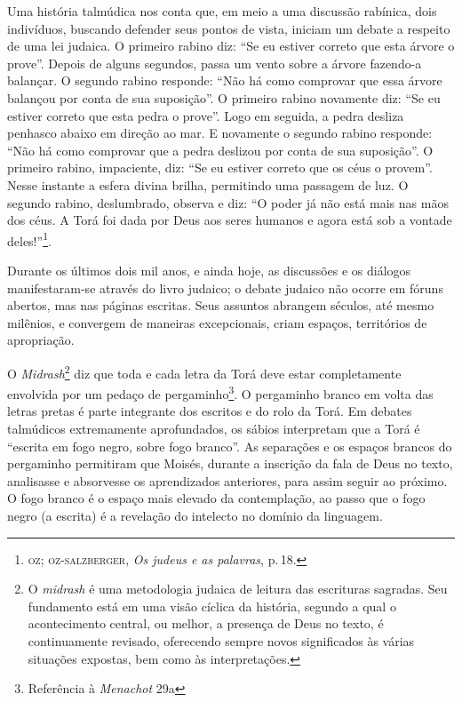 
Uma história talmúdica nos conta que, em meio a uma discussão
rabínica, dois indivíduos, buscando defender seus pontos de vista,
iniciam um debate a respeito de uma lei judaica. O primeiro rabino diz:
``Se eu estiver correto que esta árvore o prove''. Depois de
alguns segundos, passa um vento sobre a árvore fazendo-a balançar. O
segundo rabino responde: ``Não há como comprovar que essa árvore
balançou por conta de sua suposição''. O primeiro rabino novamente diz:
``Se eu estiver correto que esta pedra o prove''. Logo em
seguida, a pedra desliza penhasco abaixo em direção ao mar. E novamente
o segundo rabino responde: ``Não há como comprovar que a pedra
deslizou por conta de sua suposição''. O primeiro rabino, impaciente,
diz: ``Se eu estiver correto que os céus o provem''. Nesse
instante a esfera divina brilha, permitindo uma passagem de luz. O
segundo rabino, deslumbrado, observa e diz: ``O poder já não está
mais nas mãos dos céus. A Torá foi dada por Deus aos seres humanos e
agora está sob a vontade deles!''\footnote{\textsc{oz; oz-salzberger}, \emph{Os
  judeus e as palavras}, p.\,18.}.

Durante os últimos dois mil anos, e ainda hoje, as discussões e os
diálogos manifestaram-se através do livro judaico; o debate judaico não
ocorre em fóruns abertos, mas nas páginas escritas. Seus assuntos
abrangem séculos, até mesmo milênios, e convergem de maneiras
excepcionais, criam espaços, territórios de apropriação.

\begin{center}\end{center}

\noindent{}O \emph{Midrash}\footnote{O \emph{midrash} é uma metodologia judaica de
  leitura das escrituras sagradas. Seu fundamento está em uma visão
  cíclica da história, segundo a qual o acontecimento central, ou
  melhor, a presença de Deus no texto, é continuamente revisado,
  oferecendo sempre novos significados às várias situações expostas, bem
  como às interpretações.} diz que toda e cada letra da Torá deve
estar completamente envolvida por um pedaço de pergaminho\footnote{Referência
  à \emph{Menachot} 29a}. O pergaminho branco em volta das letras pretas
é parte integrante dos escritos e do rolo da Torá. Em debates
talmúdicos extremamente aprofundados, os sábios interpretam que a
Torá é ``escrita em fogo negro, sobre fogo branco''. As
separações e os espaços brancos do pergaminho permitiram que Moisés,
durante a inscrição da fala de Deus no texto, analisasse e absorvesse os
aprendizados anteriores, para assim seguir ao próximo. O fogo branco é o
espaço mais elevado da contemplação, ao passo que o fogo negro (a
escrita) é a revelação do intelecto no domínio da linguagem.

